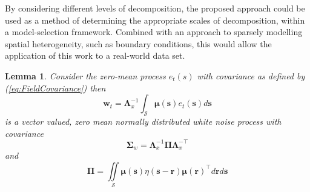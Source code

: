 \documentclass[draftcls,onecolumn]{IEEEtran}
\begin{document}
{{{By considering different levels of decomposition, the proposed approach could be used as a method of determining the appropriate scales of decomposition, within a model-selection framework. Combined with an approach to sparsely modelling spatial heterogeneity, such as boundary conditions, this would allow the application of this work to a real-world data set.
\appendix  %
%
\newtheorem{lemma}{Lemma}
\begin{lemma}
Consider the zero-mean process $e_t\left(s\right)$ with covariance as defined by (\ref{eq:FieldCovariance}) then
\begin{equation}
 \mathbf{w}_t=\mathbf{\Lambda}_{x}^{-1}\int_{\mathcal{S}}\boldsymbol\mu \left(\mathbf{s}\right)e_t\left(\mathbf{s}\right)d\mathbf{s}
\label{eq:AppendixWt}
\end{equation}
is a vector valued, zero mean normally distributed white noise process with covariance
\begin{equation}
\boldsymbol\Sigma_w =\mathbf{\Lambda}_{x}^{-1}\boldsymbol\Pi\mathbf{\Lambda}_{x}^{- \top}
\end{equation}
and
\begin{equation}
 \boldsymbol\Pi=\iint\limits_{\mathcal{S}}\boldsymbol\mu\left(\mathbf s\right)\eta\left(\mathbf s-\mathbf r\right)\boldsymbol\mu\left(\mathbf r\right)^\top d\mathbf{r}d\mathbf{s}
\end{equation}

\end{lemma}}}}
\end{document}
